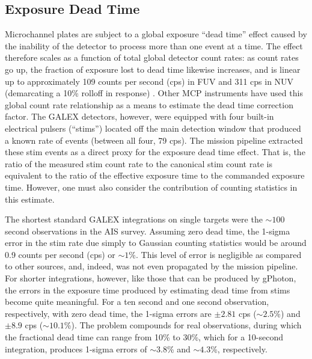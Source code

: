 \documentclass[5p]{elsarticle}
\begin{document}
\subsection{Exposure Dead Time}
\label{deadtimedesc}
Microchannel plates are subject to a global exposure ``dead time'' effect caused by the inability of the detector to process more than one event at a time. The effect therefore scales as a function of total global detector count rates: as count rates go up, the fraction of exposure lost to dead time likewise increases, and is linear up to approximately 109 counts per second (cps) in FUV and 311 cps in NUV (demarcating a 10\% rolloff in response) \citet{mor2007}. Other MCP instruments have used this global count rate relationship as a means to estimate the dead time correction factor. The GALEX detectors, however, were equipped with four built-in electrical pulsers (``stims'') located off the main detection window that produced a known rate of events (between all four, 79 cps). The mission pipeline extracted these stim events as a direct proxy for the exposure dead time effect. That is, the ratio of the measured stim count rate to the canonical stim count rate is equivalent to the ratio of the effective exposure time to the commanded exposure time. However, one must also consider the contribution of counting statistics in this estimate.

The shortest standard GALEX integrations on single targets were the $\sim 100$ second observations in the AIS survey. Assuming zero dead time, the 1-sigma error in the stim rate due simply to Gaussian counting statistics would be around 0.9 counts per second (cps) or $\sim 1$\%. This level of error is negligible as compared to other sources, and, indeed, was not even propagated by the mission pipeline. For shorter integrations, however, like those that can be produced by gPhoton, the errors in the exposure time produced by estimating dead time from stims become quite meaningful. For a ten second and one second observation, respectively, with zero dead time, the 1-sigma errors are $\pm 2.81$ cps ($\sim 2.5$\%) and $\pm 8.9$ cps ($\sim 10.1$\%). The problem compounds for real observations, during which the fractional dead time can range from 10\% to 30\%, which for a 10-second integration, produces 1-sigma errors of $\sim 3.8$\% and $\sim 4.3$\%, respectively.
\end{document}
